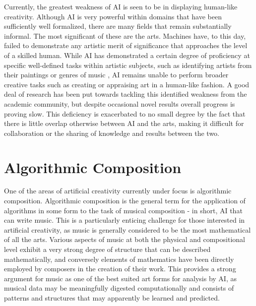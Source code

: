 \documentclass[ author={Stephen Livermore-Tozer},
				supervisor={Dr. Peter Flach},
				degree={MEng},
				title={Algorithmic Co-composition Using Machine Learning},
				subtitle={},
				type={research},
				year={2016} ]{dissertation}
\begin{document}
	Currently, the greatest weakness of AI is seen to be in displaying human-like creativity. Although AI is very powerful within domains that have been sufficiently well formalized, there are many fields that remain substantially informal. The most significant of these are the arts. Machines have, to this day, failed to demonstrate any artistic merit of significance that approaches the level of a skilled human. While AI has demonstrated a certain degree of proficiency at specific well-defined tasks within artistic subjects, such as identifying artists from their paintings \cite{blessing2010using} or genres of music \cite{haggblade2011music}, AI remains unable to perform broader creative tasks such as creating or appraising art in a human-like fashion. A good deal of research has been put towards tackling this identified weakness from the academic community, but despite occasional novel results overall progress is proving slow. This deficiency is exacerbated to no small degree by the fact that there is little overlap otherwise between AI and the arts, making it difficult for collaboration or the sharing of knowledge and results between the two.
	
	
	\section{Algorithmic Composition}
	
	One of the areas of artificial creativity currently under focus is algorithmic composition. Algorithmic composition is the general term for the application of algorithms in some form to the task of musical composition - in short, AI that can write music. This is a particularly enticing challenge for those interested in artificial creativity, as music is generally considered to be the most mathematical of all the arts. Various aspects of music at both the physical and compositional level exhibit a very strong degree of structure that can be described mathematically, and conversely elements of mathematics have been directly employed by composers in the creation of their work. This provides a strong argument for music as one of the best suited art forms for analysis by AI, as musical data may be meaningfully digested computationally and consists of patterns and structures that may apparently be learned and predicted. 
	
\end{document}

